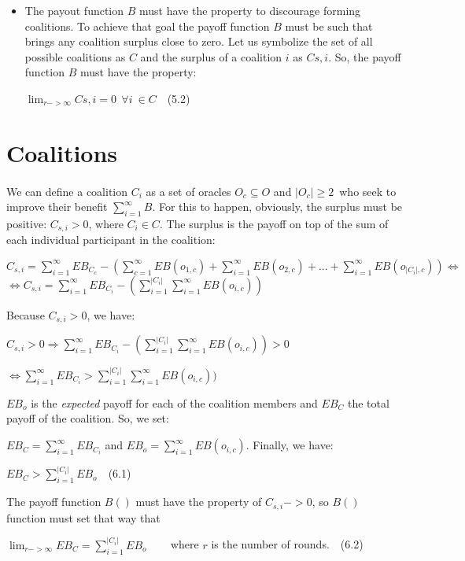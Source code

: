 \documentclass{article}
\begin{document}
\begin{itemize}
\item The payout function $B$ must have the property to discourage forming coalitions. To achieve that goal the payoff function $B$ must be such that brings any coalition surplus close to zero. Let us symbolize the set of all possible coalitions as $C$ and the surplus of a coalition $i$ as $C{s,i}$. So, the payoff function $B$ must have the property:\par
$\lim_{r->\infty}C{s,i}=0 ~~\forall i ~\in C$~~(5.2)
\end{itemize}

\section{Coalitions}
\paragraph{ }
We can define a coalition $C_i$ as a set of oracles $O_c\subseteq{O}$ and $|O_c|\geq2$~who seek to improve their benefit $\displaystyle\sum^{\infty}_{i=1}B$. For this to happen, obviously, the surplus must be positive: $C_{s,i}>0$, where $C_i \in C$. The surplus is the payoff on top of the sum of each individual participant in the coalition:
\par $C_{s,i}=\displaystyle\sum^{\infty}_{i=1}EB_{C_c}-(\displaystyle\sum^{\infty}_{c=1}EB(o_{1,c})+
\displaystyle\sum^{\infty}_{i=1}EB(o_{2,c})+...+
\displaystyle\sum^{\infty}_{i=1}EB(o_{|C_i|,c}))\Leftrightarrow$
$\Leftrightarrow C_{s,i}=\displaystyle\sum^{\infty}_{i=1}EB_{C_i}-(\displaystyle\sum^{|C_i|}_{i=1}\displaystyle\sum^{\infty}_{i=1}EB(o_{i,c}))$
\par Because $C_{s,i}>0$, we have:
\par $C_{s,i}>0\Rightarrow \displaystyle\sum^{\infty}_{i=1}EB_{C_i}-(\displaystyle\sum^{|C_i|}_{i=1}\displaystyle\sum^{\infty}_{i=1}EB(o_{i,c}))>0$ 
\par $\Leftrightarrow \displaystyle\sum^{\infty}_{i=1}EB_{C_i} > \displaystyle\sum^{|C_i|}_{i=1}\displaystyle\sum^{\infty}_{i=1}EB(o_{i,c}))$

\par $EB_{o}$ is the \emph{expected} payoff for each of the coalition members and $EB_{C}$ the total payoff of the coalition. So, we set:
\par $EB_{C}= \displaystyle\sum^{\infty}_{i=1}EB_{C_i}$ and $EB_{o}=\displaystyle\sum^{\infty}_{i=1}EB(o_{i,c})$. Finally, we have:
\par $EB_{C} > \displaystyle\sum^{|C_i|}_{i=1}EB_{o}$~~(6.1)
\par The payoff function $B()$ must have the property of $C_{s,i}->0$, so $B()$ function must set that way that 
\par $\lim_{r->\infty}EB_{C} = \displaystyle\sum^{|C_i|}_{i=1}EB_{o}$ ~~~ where $r$ is the number of rounds.~~(6.2)
\end{document}
